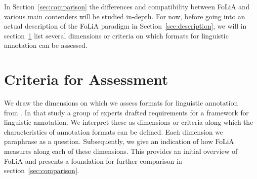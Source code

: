 \documentclass[a4paper,10pt,twoside]{article}
\begin{document}
In Section~\ref{sec:comparison} the differences and compatibility between FoLiA
and various main contenders will be studied in-depth. For now, before going
into an actual description of the FoLiA paradigm in
Section~\ref{sec:description}, we will in section~\ref{sec:criteria} list several dimensions or criteria on
which formats for linguistic annotation can be assessed.

\section{Criteria for Assessment}
\label{sec:criteria}

We draw the dimensions on which we assess formats for linguistic annotation
from . In that study a group of experts drafted requirements for
a framework for linguistic annotation. We interpret these as dimensions or
criteria along which the characteristics of annotation formats can be defined. Each dimension we paraphrase as a
question. Subsequently, we give an indication of how FoLiA measures along each of these
dimensions. This provides an initial overview of FoLiA and presents
a foundation for further comparison in section~\ref{sec:comparison}.
\end{document}
